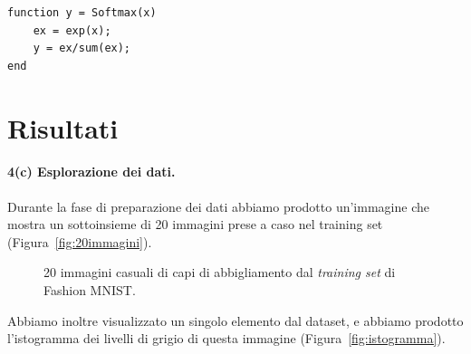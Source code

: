 \documentclass[a4paper,12pt]{article}
\begin{document}
\begin{lstlisting}[style=Matlab-editor,title=\texttt{Softmax.mat}]
function y = Softmax(x)
    ex = exp(x);
    y = ex/sum(ex);
end
\end{lstlisting}






\newpage
\section{Risultati} %
\label{sec:risultati}

\paragraph{4(c) Esplorazione dei dati.} Durante la fase di preparazione dei dati abbiamo prodotto un'immagine che mostra un sottoinsieme di 20 immagini prese a caso nel training set (Figura~\vref{fig:20immagini}). 

\begin{figure}[htb]
    \center
    \caption{20 immagini casuali di capi di abbigliamento dal \emph{training set} di Fashion MNIST.}
    \label{fig:20immagini}
\end{figure}

\newpage
Abbiamo inoltre visualizzato un singolo elemento dal dataset, e abbiamo prodotto l'istogramma dei livelli di grigio di questa immagine (Figura~\vref{fig:istogramma}).
\end{document}
